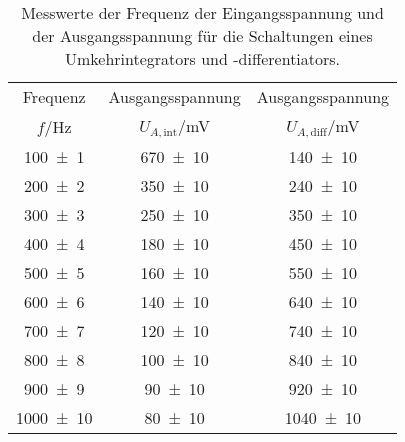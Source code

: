 \begin{table}[!h]
	\centering
	\begin{tabular}{ccc}
		\toprule
		Frequenz & Ausgangsspannung & Ausgangsspannung\\
		$f$/\si{\hertz} & $U_{A,\mathrm{int}}$/\si{\milli\volt} & $U_{A,\mathrm{diff}}$/\si{\milli\volt}\\
\midrule
		\num{100(1)} & \num{670(10)} & \num{140(10)}\\
		\num{200(2)} & \num{350(10)} & \num{240(10)}\\
		\num{300(3)} & \num{250(10)} & \num{350(10)}\\
		\num{400(4)} & \num{180(10)} & \num{450(10)}\\
		\num{500(5)} & \num{160(10)} & \num{550(10)}\\
		\num{600(6)} & \num{140(10)} & \num{640(10)}\\
		\num{700(7)} & \num{120(10)} & \num{740(10)}\\
		\num{800(8)} & \num{100(10)} & \num{840(10)}\\
		\num{900(9)} & \num{90(10)} & \num{920(10)}\\
		\num{1000(10)} & \num{80(10)} & \num{1040(10)}\\
		\bottomrule
	\end{tabular}
	\caption{ Messwerte der Frequenz der Eingangsspannung und der Ausgangsspannung für die Schaltungen eines Umkehrintegrators und -differentiators. \label{tab:integrator_differentiator}}
\end{table}
